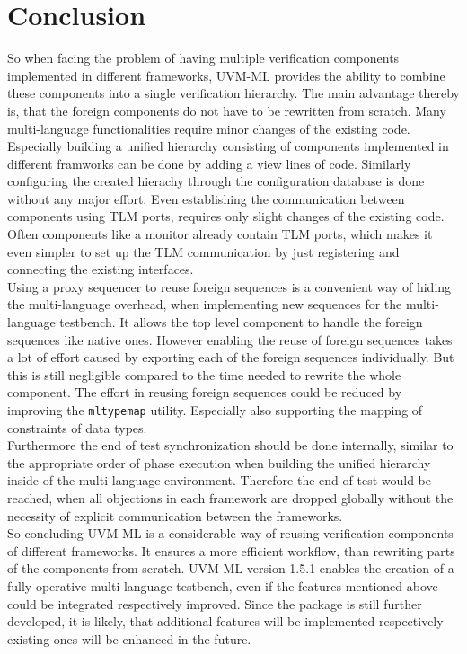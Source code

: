 \section{Conclusion}\label{conclusion}
So when facing the problem of having multiple verification components implemented in different frameworks, UVM-ML provides the ability to combine these components into a single verification hierarchy. The main advantage thereby is, that the foreign components do not have to be rewritten from scratch. Many multi-language functionalities require minor changes of the existing code. Especially building a unified hierarchy consisting of components implemented in different framworks can be done by adding a view lines of code. Similarly configuring the created hierachy through the configuration database is done without any major effort. Even establishing the communication between components using TLM ports, requires only slight changes of the existing code. Often components like a monitor already contain TLM ports, which makes it even simpler to set up the TLM communication by just registering and connecting the existing interfaces.\\
Using a proxy sequencer to reuse foreign sequences is a convenient way of hiding the multi-language overhead, when implementing new sequences for the multi-language testbench. It allows the top level component to handle the foreign sequences like native ones. However enabling the reuse of foreign sequences takes a lot of effort caused by exporting each of the foreign sequences individually. But this is still negligible compared to the time needed to rewrite the whole component. The effort in reusing foreign sequences could be reduced by improving the \lstinline$mltypemap$ utility. Especially also supporting the mapping of constraints of data types.\\
Furthermore the end of test synchronization should be done internally, similar to the appropriate order of phase execution when building the unified hierarchy inside of the multi-language environment. Therefore the end of test would be reached, when all objections in each framework are dropped globally without the necessity of explicit communication between the frameworks.\\
So concluding UVM-ML is a considerable way of reusing verification components of different frameworks. It ensures a more efficient workflow, than rewriting parts of the components from scratch. UVM-ML version 1.5.1 enables the creation of a fully operative multi-language testbench, even if the features mentioned above could be integrated respectively improved.
Since the package is still further developed, it is likely, that additional features will be implemented respectively existing ones will be enhanced in the future.
